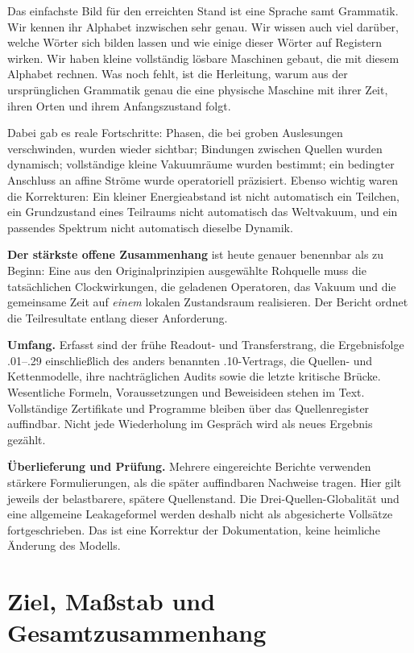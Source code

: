\documentclass[11pt,a4paper,oneside,parskip=half,headings=normal,numbers=noenddot,bibliography=totoc]{scrreprt}
\begin{document}
Das einfachste Bild für den erreichten Stand ist eine Sprache samt Grammatik. Wir kennen ihr Alphabet inzwischen sehr genau. Wir wissen auch viel darüber, welche Wörter sich bilden lassen und wie einige dieser Wörter auf Registern wirken. Wir haben kleine vollständig lösbare Maschinen gebaut, die mit diesem Alphabet rechnen. Was noch fehlt, ist die Herleitung, warum aus der ursprünglichen Grammatik genau die eine physische Maschine mit ihrer Zeit, ihren Orten und ihrem Anfangszustand folgt.

Dabei gab es reale Fortschritte: Phasen, die bei groben Auslesungen verschwinden, wurden wieder sichtbar; Bindungen zwischen Quellen wurden dynamisch; vollständige kleine Vakuumräume wurden bestimmt; ein bedingter Anschluss an affine Ströme wurde operatoriell präzisiert. Ebenso wichtig waren die Korrekturen: Ein kleiner Energieabstand ist nicht automatisch ein Teilchen, ein Grundzustand eines Teilraums nicht automatisch das Weltvakuum, und ein passendes Spektrum nicht automatisch dieselbe Dynamik.

\textbf{Der stärkste offene Zusammenhang} ist heute genauer benennbar als zu Beginn: Eine aus den Originalprinzipien ausgewählte Rohquelle muss die tatsächlichen Clockwirkungen, die geladenen Operatoren, das Vakuum und die gemeinsame Zeit auf \emph{einem} lokalen Zustandsraum realisieren. Der Bericht ordnet die Teilresultate entlang dieser Anforderung.

\textbf{Umfang.} Erfasst sind der frühe Readout- und Transferstrang, die Ergebnisfolge .01--.29 einschließlich des anders benannten .10-Vertrags, die Quellen- und Kettenmodelle, ihre nachträglichen Audits sowie die letzte kritische Brücke. Wesentliche Formeln, Voraussetzungen und Beweisideen stehen im Text. Vollständige Zertifikate und Programme bleiben über das Quellenregister auffindbar. Nicht jede Wiederholung im Gespräch wird als neues Ergebnis gezählt.

\textbf{Überlieferung und Prüfung.} Mehrere eingereichte Berichte verwenden stärkere Formulierungen, als die später auffindbaren Nachweise tragen. Hier gilt jeweils der belastbarere, spätere Quellenstand. Die Drei-Quellen-Globalität und eine allgemeine Leakageformel werden deshalb nicht als abgesicherte Vollsätze fortgeschrieben. Das ist eine Korrektur der Dokumentation, keine heimliche Änderung des Modells.
\tableofcontents
\clearpage
{}
\chapter{Ziel, Maßstab und Gesamtzusammenhang}
\end{document}
